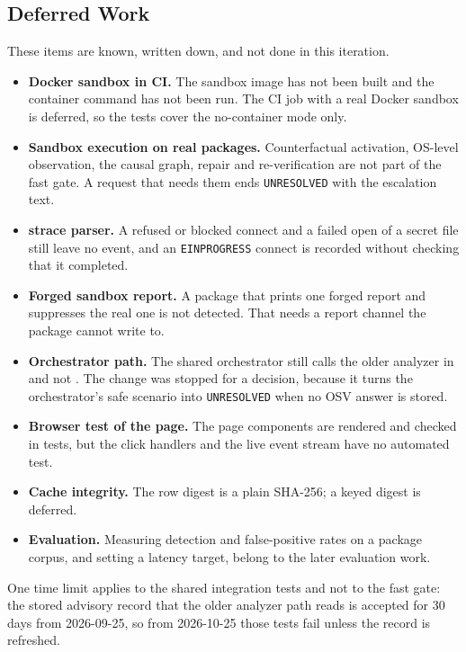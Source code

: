 \subsection{Deferred Work}
These items are known, written down, and not done in this iteration.
\begin{sloppypar}
\begin{itemize}
    \item \textbf{Docker sandbox in CI.} The sandbox image has not been built and the container command has not been run. The CI job with a real Docker sandbox is deferred, so the tests cover the no-container mode only.
    \item \textbf{Sandbox execution on real packages.} Counterfactual activation, OS-level observation, the causal graph, repair and re-verification are not part of the fast gate. A request that needs them ends \texttt{UNRESOLVED} with the escalation text.
    \item \textbf{strace parser.} A refused or blocked connect and a failed open of a secret file still leave no event, and an \texttt{EINPROGRESS} connect is recorded without checking that it completed.
    \item \textbf{Forged sandbox report.} A package that prints one forged report and suppresses the real one is not detected. That needs a report channel the package cannot write to.
    \item \textbf{Orchestrator path.} The shared orchestrator still calls the older analyzer in  and not . The change was stopped for a decision, because it turns the orchestrator's safe scenario into \texttt{UNRESOLVED} when no OSV answer is stored.
    \item \textbf{Browser test of the page.} The page components are rendered and checked in tests, but the click handlers and the live event stream have no automated test.
    \item \textbf{Cache integrity.} The row digest is a plain SHA-256; a keyed digest is deferred.
    \item \textbf{Evaluation.} Measuring detection and false-positive rates on a package corpus, and setting a latency target, belong to the later evaluation work.
\end{itemize}
\end{sloppypar}
\begin{sloppypar}
One time limit applies to the shared integration tests and not to the fast gate: the stored advisory record that the older analyzer path reads is accepted for 30 days from 2026-09-25, so from 2026-10-25 those tests fail unless the record is refreshed.
\end{sloppypar}
